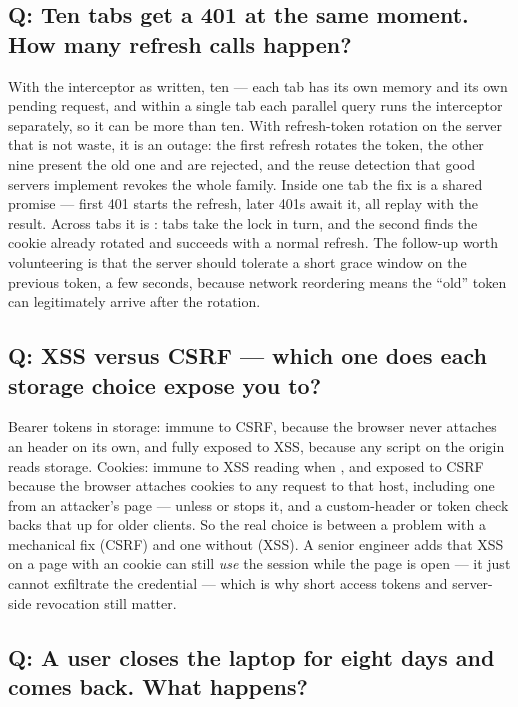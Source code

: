\subsection*{Q: Ten tabs get a 401 at the same moment. How many refresh calls happen?}

With the interceptor as written, ten --- each tab has its own memory
and its own pending request, and within a single tab each parallel
query runs the interceptor separately, so it can be more than ten. With
refresh-token rotation on the server that is not waste, it is an
outage: the first refresh rotates the token, the other nine present the
old one and are rejected, and the reuse detection that good servers
implement revokes the whole family. Inside one tab the fix is a shared
promise --- first 401 starts the refresh, later 401s await it, all
replay with the result. Across tabs it is : tabs
take the lock in turn, and the second finds the cookie already rotated
and succeeds with a normal refresh. The follow-up worth volunteering is
that the server should tolerate a short grace window on the previous
token, a few seconds, because network reordering means the ``old''
token can legitimately arrive after the rotation.

\subsection*{Q: XSS versus CSRF --- which one does each storage choice expose you to?}

Bearer tokens in storage: immune to CSRF, because the browser never
attaches an  header on its own, and fully exposed
to XSS, because any script on the origin reads storage. Cookies: immune
to XSS reading when , and exposed to CSRF because the
browser attaches cookies to any request to that host, including one
from an attacker's page --- unless  or
 stops it, and a custom-header or token check backs that up
for older clients. So the real choice is between a problem with a
mechanical fix (CSRF) and one without (XSS). A senior engineer adds
that XSS on a page with an  cookie can still \emph{use}
the session while the page is open --- it just cannot exfiltrate the
credential --- which is why short access tokens and server-side
revocation still matter.

\subsection*{Q: A user closes the laptop for eight days and comes back. What happens?}

